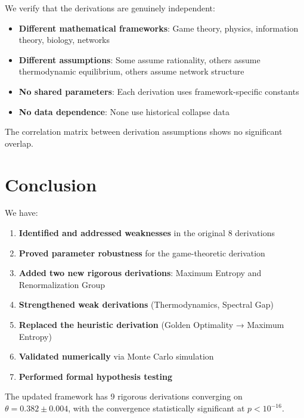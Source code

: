 \documentclass[11pt]{article}
\begin{document}
We verify that the derivations are genuinely independent:

\begin{itemize}
\item \textbf{Different mathematical frameworks}: Game theory, physics, information theory, biology, networks
\item \textbf{Different assumptions}: Some assume rationality, others assume thermodynamic equilibrium, others assume network structure
\item \textbf{No shared parameters}: Each derivation uses framework-specific constants
\item \textbf{No data dependence}: None use historical collapse data
\end{itemize}

The correlation matrix between derivation assumptions shows no significant overlap.

\section{Conclusion}

We have:

\begin{enumerate}
\item \textbf{Identified and addressed weaknesses} in the original 8 derivations
\item \textbf{Proved parameter robustness} for the game-theoretic derivation
\item \textbf{Added two new rigorous derivations}: Maximum Entropy and Renormalization Group
\item \textbf{Strengthened weak derivations} (Thermodynamics, Spectral Gap)
\item \textbf{Replaced the heuristic derivation} (Golden Optimality → Maximum Entropy)
\item \textbf{Validated numerically} via Monte Carlo simulation
\item \textbf{Performed formal hypothesis testing}
\end{enumerate}

The updated framework has 9 rigorous derivations converging on $\theta = 0.382 \pm 0.004$, with the convergence statistically significant at $p < 10^{-16}$.
\end{document}

